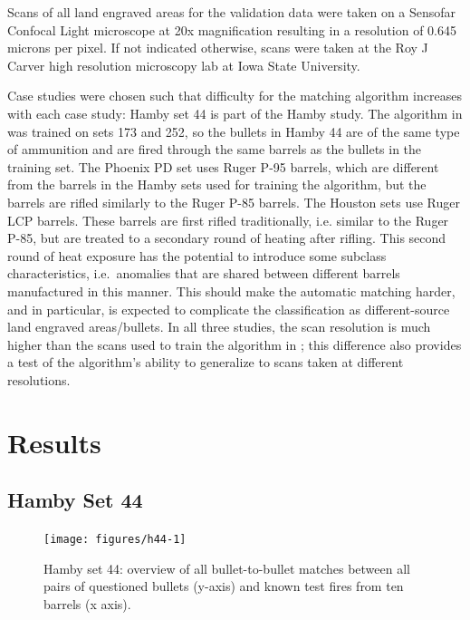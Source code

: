 \documentclass[doubleblind]{elsarticle}\usepackage[]{graphicx}\usepackage[]{color}
\newenvironment{knitrout}{}{} %
\begin{document}
Scans of all land engraved areas for the validation data were taken on a Sensofar Confocal Light microscope at 20x magnification resulting in a resolution of 0.645 microns per pixel. If not indicated otherwise, scans were taken at the Roy J Carver high resolution microscopy lab at Iowa State University.
 
Case studies were chosen such that difficulty for the matching algorithm increases with each case study: Hamby set 44 is part of the Hamby study. The algorithm in \citet{aoas2} was trained on sets 173 and 252, so the bullets in Hamby 44 are of the same type of ammunition and are fired through the same barrels as the bullets in the training set. The Phoenix PD set uses Ruger P-95 barrels, which are different from the barrels in the Hamby sets used for training the algorithm, but the barrels are rifled similarly to the Ruger P-85 barrels. The Houston sets use Ruger LCP barrels. These barrels are first rifled traditionally, i.e. similar to the Ruger P-85, but are treated to a secondary round of heating after rifling. This second round of heat exposure has the potential to introduce some subclass characteristics, i.e.\ anomalies that are shared between different barrels manufactured in this manner. This should make the automatic matching harder, and in particular, is expected to complicate the classification as different-source land engraved areas/bullets. In all three studies, the scan resolution is much higher than the scans used to train the algorithm in \citet{aoas2}; this difference also provides a test of the algorithm's ability to generalize to scans taken at different resolutions.

\section{Results}

\subsection{Hamby Set 44}

\begin{knitrout}
\color{fgcolor}\begin{figure}

{\centering \texttt{[image: figures/h44-1]} 

}

\caption[Hamby set 44]{Hamby set 44: overview of all bullet-to-bullet matches between all pairs of questioned bullets (y-axis) and known test fires from ten barrels (x axis).}\label{fig:h44}
\end{figure}


\end{knitrout}
\end{document}

